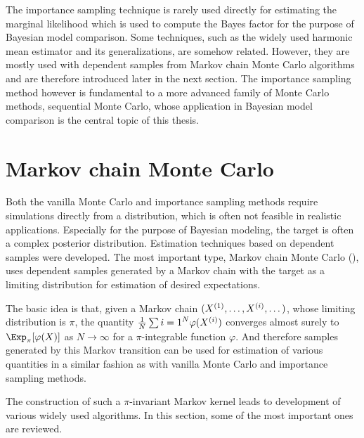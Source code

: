 \documentclass[11pt, hyper, bib, fontset=Minion]{marticle}
\begin{document}
The importance sampling technique is rarely used directly for estimating the
marginal likelihood which is used to compute the Bayes factor for the purpose
of Bayesian model comparison. Some techniques, such as the widely used
harmonic mean estimator and its generalizations, are somehow related. However,
they are mostly used with dependent samples from Markov chain Monte Carlo
algorithms and are therefore introduced later in the next section. The
importance sampling method however is fundamental to a more advanced family of
Monte Carlo methods, sequential Monte Carlo, whose application in Bayesian
model comparison is the central topic of this thesis.

\section{Markov chain Monte Carlo}
\label{sec:Markov chain Monte Carlo}

Both the vanilla Monte Carlo and importance sampling methods require
simulations directly from a distribution, which is often not feasible in
realistic applications. Especially for the purpose of Bayesian modeling, the
target is often a complex posterior distribution. Estimation techniques based
on dependent samples were developed. The most important type, Markov chain
Monte Carlo (\mcmc), uses dependent samples generated by a Markov chain with
the target as a limiting distribution for estimation of desired expectations.



The basic idea is that, given a Markov chain $(X^{(1)},\dots,X^{(i)},\dots)$,
whose limiting distribution is $\pi$, the quantity $\frac{1}{N}\sum{i=1}^N
\varphi(X^{(i)})$ converges almost surely to $\Exp_{\pi}[\varphi(X)]$ as
$N\to\infty$ for a $\pi$-integrable function $\varphi$. And therefore samples
generated by this Markov transition can be used for estimation of various
quantities in a similar fashion as with vanilla Monte Carlo and importance
sampling methods.

The construction of such a $\pi$-invariant Markov kernel leads to development
of various widely used \mcmc algorithms. In this section, some of the most
important ones are reviewed.
\end{document}
